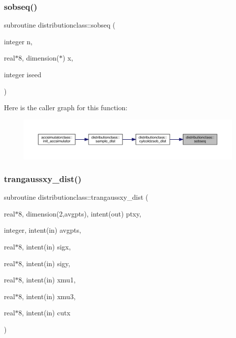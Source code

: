 \subsubsection{\texorpdfstring{sobseq()}{sobseq()}}
{\footnotesize\ttfamily subroutine distributionclass\+::sobseq (\begin{DoxyParamCaption}\item[{integer}]{n,  }\item[{real$\ast$8, dimension($\ast$)}]{x,  }\item[{integer}]{iseed }\end{DoxyParamCaption})}

Here is the caller graph for this function\+:\nopagebreak
\begin{figure}[H]
\begin{center}
\leavevmode
\includegraphics[width=350pt]{namespacedistributionclass_a8125c1fdf424cfd4bad6cd74eb2d3946_icgraph}
\end{center}
\end{figure}
\mbox{\label{namespacedistributionclass_a42ccdb5100e3e35c9424c89dcac131c1}} 
\subsubsection{\texorpdfstring{trangaussxy\_dist()}{trangaussxy\_dist()}}
{\footnotesize\ttfamily subroutine distributionclass\+::trangaussxy\+\_\+dist (\begin{DoxyParamCaption}\item[{real$\ast$8, dimension(2,avgpts), intent(out)}]{ptxy,  }\item[{integer, intent(in)}]{avgpts,  }\item[{real$\ast$8, intent(in)}]{sigx,  }\item[{real$\ast$8, intent(in)}]{sigy,  }\item[{real$\ast$8, intent(in)}]{xmu1,  }\item[{real$\ast$8, intent(in)}]{xmu3,  }\item[{real$\ast$8, intent(in)}]{cutx }\end{DoxyParamCaption})}




